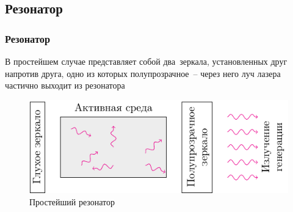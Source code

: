 \documentclass[10pt,pdf,hyperref={unicode}, dvipsnames]{beamer}
\newcommand\frametitless[1]{\subsection{#1}\frametitle{#1}}
\begin{document}
\begin{frame}[t]
	\frametitless{Резонатор}

	В простейшем случае представляет собой два зеркала, установленных друг напротив друга, одно из которых полупрозрачное -- через него луч лазера частично выходит из резонатора

	\vfill
	\begin{figure}[h]
		\centering
		\includegraphics[]{images/resonator}
		\caption{Простейший резонатор}
	\end{figure}	
	\vfill
\end{frame}


\end{document}
